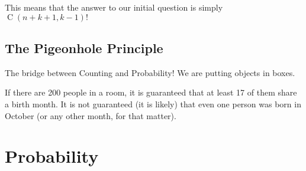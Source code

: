 \documentclass{report}
\DeclareMathOperator{\comb}{C}
\begin{document}
This means that the answer to our initial question is simply
$\comb(n + k + 1, k - 1)!$

\section{The Pigeonhole Principle}

The bridge between Counting and Probability!
We are putting objects in boxes.

If there are 200 people in a room, it is guaranteed that at least 17 of them share a birth month. It is not guaranteed (it is likely) that even one person was born in October (or any other month, for that matter). 

\chapter{Probability}
\end{document}
